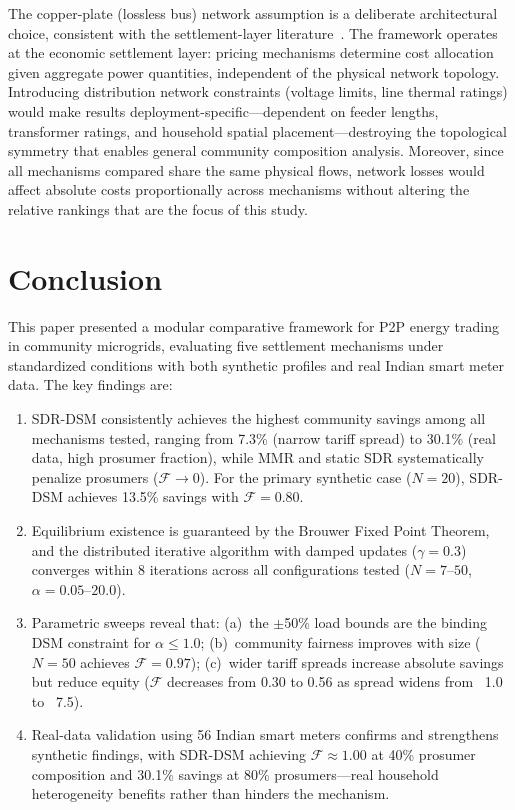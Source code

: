 \documentclass[pdflatex,sn-mathphys-num]{sn-jnl}
\newcommand{\rupee}{\text{Rs.}}
\theoremstyle{thmstyleone}
\theoremstyle{thmstyletwo}
\begin{document}
The copper-plate (lossless bus) network assumption is a deliberate architectural choice, consistent with the settlement-layer literature~\cite{liu2017, long2017, alfaverh2023}. The framework operates at the economic settlement layer: pricing mechanisms determine cost allocation given aggregate power quantities, independent of the physical network topology. Introducing distribution network constraints (voltage limits, line thermal ratings) would make results deployment-specific---dependent on feeder lengths, transformer ratings, and household spatial placement---destroying the topological symmetry that enables general community composition analysis. Moreover, since all mechanisms compared share the same physical flows, network losses would affect absolute costs proportionally across mechanisms without altering the relative rankings that are the focus of this study.

\section{Conclusion}\label{sec:conclusion}

This paper presented a modular comparative framework for P2P energy trading in community microgrids, evaluating five settlement mechanisms under standardized conditions with both synthetic profiles and real Indian smart meter data. The key findings are:

\begin{enumerate}
    \item SDR-DSM consistently achieves the highest community savings among all mechanisms tested, ranging from 7.3\% (narrow tariff spread) to 30.1\% (real data, high prosumer fraction), while MMR and static SDR systematically penalize prosumers ($\mathcal{F} \to 0$). For the primary synthetic case ($N=20$), SDR-DSM achieves 13.5\% savings with $\mathcal{F} = 0.80$.
    \item Equilibrium existence is guaranteed by the Brouwer Fixed Point Theorem, and the distributed iterative algorithm with damped updates ($\gamma = 0.3$) converges within 8 iterations across all configurations tested ($N = 7$--$50$, $\alpha = 0.05$--$20.0$).
    \item Parametric sweeps reveal that: (a)~the $\pm$50\% load bounds are the binding DSM constraint for $\alpha \leq 1.0$; (b)~community fairness improves with size ($N=50$ achieves $\mathcal{F} = 0.97$); (c)~wider tariff spreads increase absolute savings but reduce equity ($\mathcal{F}$ decreases from 0.30 to 0.56 as spread widens from \rupee~1.0 to \rupee~7.5).
    \item Real-data validation using 56 Indian smart meters confirms and strengthens synthetic findings, with SDR-DSM achieving $\mathcal{F} \approx 1.00$ at 40\% prosumer composition and 30.1\% savings at 80\% prosumers---real household heterogeneity benefits rather than hinders the mechanism.
\end{enumerate}
\end{document}
